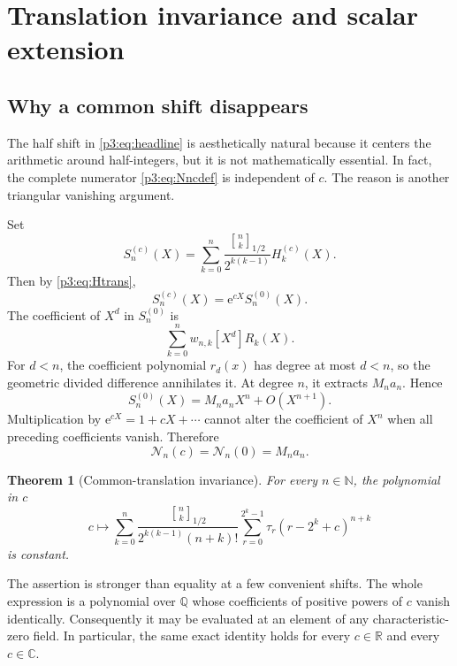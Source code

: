 \documentclass[11pt,oneside]{article}
\newtheorem{theorem}{Theorem}[section]
\theoremstyle{definition}
\theoremstyle{remark}
\newcommand{\halfqbinom}[2]{{\genfrac{[}{]}{0pt}{}{#1}{#2}}_{1/2}}
\newcommand{\coeff}[2]{\left[#1^{#2}\right]}
\newcommand{\N}{\mathbb N}
\newcommand{\Q}{\mathbb Q}
\newcommand{\R}{\mathbb R}
\newcommand{\C}{\mathbb C}
\newcommand{\e}{\mathrm e}
\newcommand{\tm}{\tau}
\begin{document}
\section{Translation invariance and scalar extension}\label{p3:sec:translation}

\subsection{Why a common shift disappears}

The half shift in \eqref{p3:eq:headline} is aesthetically natural because it
centers the arithmetic around half-integers, but it is not mathematically
essential.  In fact, the complete numerator \eqref{p3:eq:Nncdef} is independent
of $c$.  The reason is another triangular vanishing argument.

Set
\begin{equation}\label{p3:eq:Snc}
 S_n^{(c)}(X)=
 \sum_{k=0}^{n}
 \frac{\halfqbinom{n}{k}}{2^{k(k-1)}}H_k^{(c)}(X).
\end{equation}
Then by \eqref{p3:eq:Htrans},
\begin{equation}\label{p3:eq:Sntranslate}
 S_n^{(c)}(X)=\e^{cX}S_n^{(0)}(X).
\end{equation}
The coefficient of $X^d$ in $S_n^{(0)}$ is
\[
 \sum_{k=0}^{n}w_{n,k}\coeff{X}{d}R_k(X).
\]
For $d<n$, the coefficient polynomial $r_d(x)$ has degree at most $d<n$,
so the geometric divided difference annihilates it.  At degree $n$, it
extracts $M_na_n$.  Hence
\begin{equation}\label{p3:eq:Snorder}
 S_n^{(0)}(X)=M_na_nX^n+O(X^{n+1}).
\end{equation}
Multiplication by $\e^{cX}=1+cX+\cdots$ cannot alter the coefficient of
$X^n$ when all preceding coefficients vanish.  Therefore
\begin{equation}\label{p3:eq:Nconstant}
 \boxed{\mathcal N_n(c)=\mathcal N_n(0)=M_na_n.}
\end{equation}

\begin{theorem}[Common-translation invariance]
For every $n\in\N$, the polynomial in $c$
\[
 c\longmapsto
 \sum_{k=0}^{n}
 \frac{\halfqbinom{n}{k}}
      {2^{k(k-1)}(n+k)!}
 \sum_{r=0}^{2^k-1}\tm_r(r-2^k+c)^{n+k}
\]
is constant.
\end{theorem}

The assertion is stronger than equality at a few convenient shifts.  The
whole expression is a polynomial over $\Q$ whose coefficients of positive
powers of $c$ vanish identically.  Consequently it may be evaluated at an
element of any characteristic-zero field.  In particular, the same exact
identity holds for every $c\in\R$ and every $c\in\C$.
\end{document}
